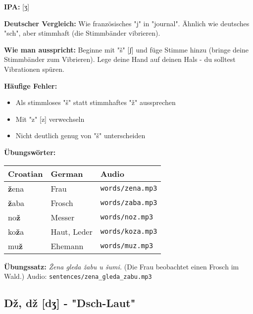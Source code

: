 \begin{tcolorbox}[colback=lightblue!30, colframe=croatianblue, title=\textbf{Ž, ž}]

\textbf{IPA:} [ʒ]

\textbf{Deutscher Vergleich:}
Wie französisches "j" in "journal". Ähnlich wie deutsches "sch", aber stimmhaft (die Stimmbänder vibrieren).

\textbf{Wie man ausspricht:}
Beginne mit "š" [ʃ] und füge Stimme hinzu (bringe deine Stimmbänder zum Vibrieren). Lege deine Hand auf deinen Hals - du solltest Vibrationen spüren.

\textbf{Häufige Fehler:}
\begin{itemize}
    \item Als stimmloses "š" statt stimmhaftes "ž" aussprechen
    \item Mit "z" [z] verwechseln
    \item Nicht deutlich genug von "š" unterscheiden
\end{itemize}

\textbf{Übungswörter:}
\begin{tabular}{lll}
\textbf{Croatian} & \textbf{German} & \textbf{Audio} \\
\midrule
\textbf{ž}ena & Frau & \texttt{words/zena.mp3} \\
\textbf{ž}aba & Frosch & \texttt{words/zaba.mp3} \\
no\textbf{ž} & Messer & \texttt{words/noz.mp3} \\
ko\textbf{ž}a & Haut, Leder & \texttt{words/koza.mp3} \\
mu\textbf{ž} & Ehemann & \texttt{words/muz.mp3} \\
\end{tabular}

\textbf{Übungssatz:}
\textit{Žena gleda žabu u šumi.}
(Die Frau beobachtet einen Frosch im Wald.)
Audio: \texttt{sentences/zena\_gleda\_zabu.mp3}

\end{tcolorbox}

\subsection{Dž, dž [dʒ] - "Dsch-Laut"}

